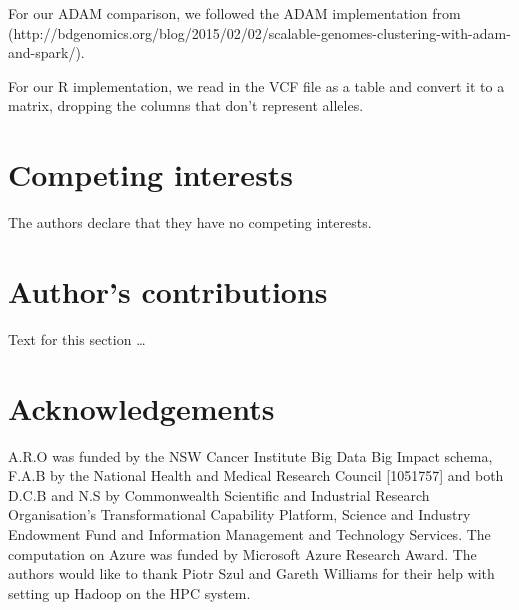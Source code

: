 \documentclass{bmcart}
\begin{document}
For our ADAM comparison, we followed the ADAM implementation from (http://bdgenomics.org/blog/2015/02/02/scalable-genomes-clustering-with-adam-and-spark/).

 For our R implementation, we read in the VCF file as a table and convert it to a matrix, dropping the columns that don't represent alleles. 



\begin{backmatter}

\section*{Competing interests}
  The authors declare that they have no competing interests.

\section*{Author's contributions}
    Text for this section \ldots

\section*{Acknowledgements}
  A.R.O was funded by the NSW Cancer Institute Big Data Big Impact schema, F.A.B by the National Health and Medical Research Council [1051757] and both D.C.B and N.S by Commonwealth Scientific and Industrial Research Organisation's Transformational Capability Platform, Science and Industry Endowment Fund and Information Management and Technology Services. The computation on Azure was funded by Microsoft Azure Research Award. 
The authors would like to thank Piotr Szul and Gareth Williams for their help with setting up Hadoop on the HPC system.



\end{backmatter}
\end{document}

